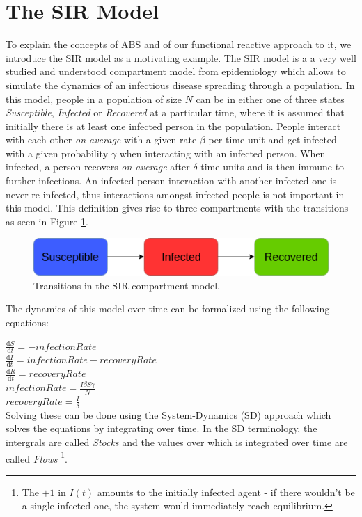 \section{The SIR Model}
To explain the concepts of ABS and of our functional reactive approach to it, we introduce the SIR model as a motivating example. The SIR model is a a very well studied and understood compartment model from epidemiology which allows to simulate the dynamics of an infectious disease spreading through a population. In this model, people in a population of size $N$ can be in either one of three states \textit{Susceptible}, \textit{Infected} or \textit{Recovered} at a particular time, where it is assumed that initially there is at least one infected person in the population. People interact with each other \textit{on average} with a given rate $\beta$ per time-unit and get infected with a given probability $\gamma$ when interacting with an infected person. When infected, a person recovers \textit{on average} after $\delta$ time-units and is then immune to further infections. An infected person interaction with another infected one is never re-infected, thus interactions amongst infected people is not important in this model. This definition gives rise to three compartments with the transitions as seen in Figure \ref{fig:sir_transitions}.

\begin{figure}
	\centering
	\includegraphics[width=.4\textwidth, angle=0]{./fig/SIR_transitions.png}
	\caption{Transitions in the SIR compartment model.}
	\label{fig:sir_transitions}
\end{figure}

The dynamics of this model over time can be formalized using the following equations:

$\frac{\mathrm d S}{\mathrm d t} = -infectionRate$ \\
$\frac{\mathrm d I}{\mathrm d t} = infectionRate - recoveryRate$ \\
$\frac{\mathrm d R}{\mathrm d t} = recoveryRate$ \\

$infectionRate = \frac{I \beta S \gamma}{N}$ \\
$recoveryRate = \frac{I}{\delta}$ \\

Solving these can be done using the System-Dynamics (SD) approach which solves the equations by integrating over time. In the SD terminology, the intergrals are called \textit{Stocks} and the values over which is integrated over time are called \textit{Flows} \footnote{The $+1$ in $I(t)$ amounts to the initially infected agent - if there wouldn't be a single infected one, the system would immediately reach equilibrium.}.


